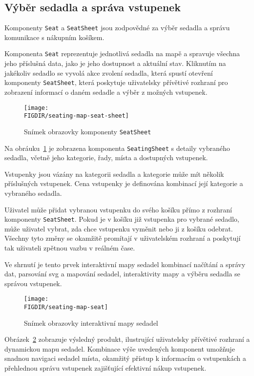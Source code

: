 \subsection{Výběr sedadla a správa vstupenek}
\label{subsec:implementace-seating-seat}
Komponenty \texttt{Seat} a \texttt{SeatSheet} jsou zodpovědné za výběr sedadla a správu komunikace s nákupním košíkem.

Komponenta \texttt{Seat} reprezentuje jednotlivá sedadla na mapě a spravuje všechna jeho příslušná data, jako je jeho dostupnost a aktuální stav.
Kliknutím na jakékoliv sedadlo se vyvolá akce zvolení sedadla, která spustí otevření komponenty \texttt{SeatSheet}, která poskytuje uživatelsky přívětivé rozhraní pro zobrazení informací o daném sedadle a výběr z možných vstupenek.

\begin{figure}[h]
	\centering
	\texttt{[image: \\FIGDIR/seating-map-seat-sheet]}
	\caption{Snímek obrazovky komponenty \texttt{SeatSheet}}
	\label{fig:seating-map-seats-sheet}
\end{figure}

Na obráuku~\ref{fig:seating-map-seats-sheet} je zobrazena komponenta \texttt{SeatingSheet} s detaily vybraného sedadla, včetně jeho kategorie, řady, místa a dostupných vstupenek.

Vstupenky jsou vázány na kategorii sedadla a kategorie může mít několik příslušných vstupenek.
Cena vstupenky je definována kombinací její kategorie a vybraného sedadla.

Uživatel může přidat vybranou vstupenku do svého košíku přímo z rozhraní komponenty \texttt{SeatSheet}.
Pokud je v košíku již vstupenka pro vybrané sedadlo, může uživatel vybrat, zda chce vstupenku vyměnit nebo ji z košíku odebrat.
Všechny tyto změny se okamžitě promítají v uživatelském rozhraní a poskytují tak uživateli zpětnou vazbu v reálném čase.

Ve shrnutí je tento prvek interaktivní mapy sedadel kombinací načítání a správy dat, parsování \ac{svg} a mapování sedadel, interaktivity mapy a výběru sedadla se správou vstupenek.

\begin{figure}[h]
    \centering
    \texttt{[image: \\FIGDIR/seating-map-seat]}
    \caption{Snímek obrazovky interaktivní mapy sedadel}
    \label{fig:seating-map-seat}
\end{figure}

Obrázek~\ref{fig:seating-map-seat} zobrazuje výsledný produkt, ilustrující uživatelsky přívětivé rozhraní a dynamickou mapu sedadel.
Kombinace výše uvedených komponent umožňuje snadnou navigaci sedadel místa, okamžitý přístup k informacím o vstupenkách a přehlednou správu vstupenek zajišťující efektivní nákup vstupenek.
